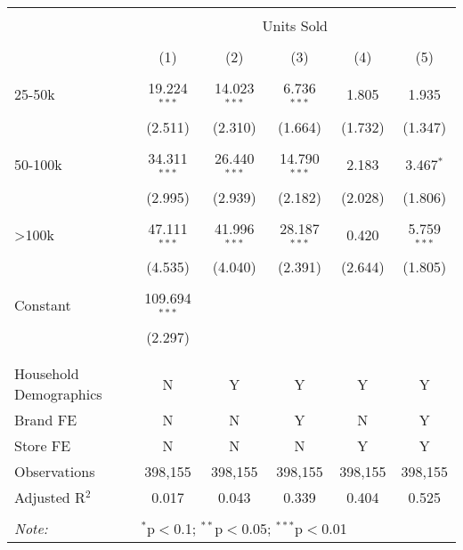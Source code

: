 
\begin{table}[!htbp] \centering 
  \caption{} 
  \label{} 
\begin{tabular}{@{\extracolsep{5pt}}lccccc} 
\\[-1.8ex]\hline 
\hline \\[-1.8ex] 
 & \multicolumn{5}{c}{Units Sold} \\ 
\cline{2-6} 
\\[-1.8ex] & (1) & (2) & (3) & (4) & (5)\\ 
\hline \\[-1.8ex] 
 25-50k & 19.224$^{***}$ & 14.023$^{***}$ & 6.736$^{***}$ & 1.805 & 1.935 \\ 
  & (2.511) & (2.310) & (1.664) & (1.732) & (1.347) \\ 
  & & & & & \\ 
 50-100k & 34.311$^{***}$ & 26.440$^{***}$ & 14.790$^{***}$ & 2.183 & 3.467$^{*}$ \\ 
  & (2.995) & (2.939) & (2.182) & (2.028) & (1.806) \\ 
  & & & & & \\ 
 >100k & 47.111$^{***}$ & 41.996$^{***}$ & 28.187$^{***}$ & 0.420 & 5.759$^{***}$ \\ 
  & (4.535) & (4.040) & (2.391) & (2.644) & (1.805) \\ 
  & & & & & \\ 
 Constant & 109.694$^{***}$ &  &  &  &  \\ 
  & (2.297) &  &  &  &  \\ 
  & & & & & \\ 
\hline \\[-1.8ex] 
Household Demographics & N & Y & Y & Y & Y \\ 
Brand FE & N & N & Y & N & Y \\ 
Store FE & N & N & N & Y & Y \\ 
Observations & 398,155 & 398,155 & 398,155 & 398,155 & 398,155 \\ 
Adjusted R$^{2}$ & 0.017 & 0.043 & 0.339 & 0.404 & 0.525 \\ 
\hline 
\hline \\[-1.8ex] 
\textit{Note:}  & \multicolumn{5}{l}{$^{*}$p$<$0.1; $^{**}$p$<$0.05; $^{***}$p$<$0.01} \\ 
\end{tabular} 
\end{table} 
